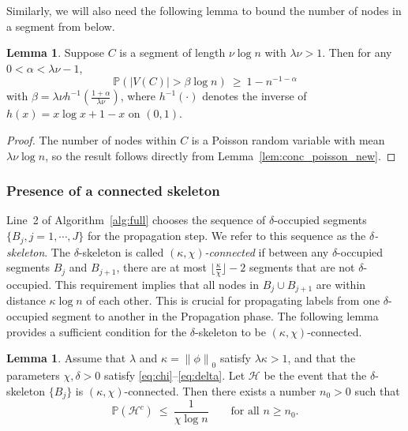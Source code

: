 \documentclass[letterpaper,11pt]{article}
\newtheorem{lem}[thm]{Lemma}
\theoremstyle{definition}
\def\P{\mathbb{P}}
\def\cH{\mathcal{H}}
\def\wge{ \ \ge \ }
\def\wle{ \ \le \ }
\newcommand{\zeronorm}[1]{{\lVert#1\rVert}_0}
\numberwithin{equation}{section}
\newcommand{\al}{\alpha}
\newcommand{\be}{\beta}
\newcommand{\de}{\delta}
\newcommand{\eps}{\epsilon}
\newcommand{\ka}{\kappa}
\newcommand{\la}{\lambda}
\newtheorem{lem}[thm]{Lemma}
\theoremstyle{definition}
\def\P{\mathbb{P}}
\def\cH{\mathcal{H}}
\def\wge{ \ \ge \ }
\def\wle{ \ \le \ }
\newcommand{\zeronorm}[1]{{\lVert#1\rVert}_0}
\numberwithin{equation}{section}
\newcommand{\al}{\alpha}
\newcommand{\be}{\beta}
\newcommand{\de}{\delta}
\newcommand{\eps}{\epsilon}
\newcommand{\ka}{\kappa}
\newcommand{\la}{\lambda}
\theoremstyle{thmstyletwo}%
\begin{document}
Similarly, we will also need the following lemma to bound the number of nodes in a segment from below.

\begin{lem}
\label{lem:single_block_nodes}
Suppose $C$ is a segment of length $\nu \log n$ with $\la \nu >1$.
Then for any $0 < \al < \la \nu - 1$,
\[
 \P(|V(C)| > \be \log n)
 \wge 1-n^{-1-\al}
\]
with $\be = \la\nu h^{-1} ( \frac{1+\al}{\la\nu} )$,
where $h^{-1}(\cdot)$ denotes the inverse of $h(x) = x \log x + 1 - x$ on $(0,1)$.
\end{lem}
\begin{proof}
The number of nodes within $C$ is a Poisson random variable with mean $\la \nu \log n$,
so the result follows directly from Lemma~\ref{lem:conc_poisson_new}.
\end{proof}

\subsubsection{Presence of a connected skeleton}
\label{sec:skeleton}

Line~2 of Algorithm~\ref{alg:full} chooses the sequence of $\de$-occupied segments
$\{B_j,j=1,\cdots,J\}$ for the propagation step.
We refer to this sequence as the \emph{$\de$-skeleton}.
The $\de$-skeleton is called \emph{$(\ka,\chi)$-connected} if between any $\de$-occupied segments
$B_j$ and $B_{j+1}$, there are at most $\lfloor\frac{\ka}{\chi}\rfloor - 2$ segments
that are not $\de$-occupied.
This requirement implies that all nodes in $B_j \cup B_{j+1}$ are within distance $\ka \log n$ of each other.
This is crucial for propagating labels from one $\delta$-occupied segment to another in the Propagation phase.
The following lemma provides a sufficient condition for the $\de$-skeleton to be $(\ka,\chi)$-connected.

\begin{lem}
\label{lem:connected_vis_graph}
Assume that $\la$ and $\ka = \zeronorm{\phi}$
satisfy $\la \ka > 1$, and that the parameters 
$\chi,\de > 0$ satisfy \eqref{eq:chi}--\eqref{eq:delta}.
Let $\cH$ be the event that the
$\de$-skeleton $\{B_j\}$ is $(\ka,\chi)$-connected.
Then there exists a number $n_0 > 0$ such that
\[
 \P(\cH^c) \wle \frac{1}{\chi \log n}
 \qquad \text{for all $n \ge n_0$}.
\]
\end{lem}
\end{document}
